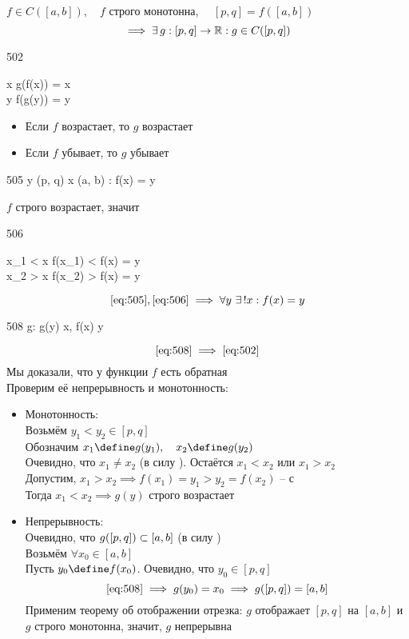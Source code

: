 \begin{theorem}
	$f \in C([a, b]), \quad f $ строго монотонна, $ \quad [p, q] = f([a, b]) $
	$$ \implies \exists\, g : [p, q] \to \mathbb{R} : g \in C([p, q]) $$
	\begin{equ}{502}
		\begin{cases}
			\forall x \in [a, b] \quad g(f(x)) = x \\
			\forall y \in [p, q] \quad f(g(y)) = y
		\end{cases}
	\end{equ}

	\begin{itemize}
		\item Если $f$ возрастает, то $g$ возрастает
		\item Если $f$ убывает, то $g$ убывает
	\end{itemize}
\end{theorem}

\begin{replacementproof}
	\begin{equ}{505}
		\forall y \in (p, q) \quad \exist x \in (a, b) : f(x) = y
	\end{equ}
	$f$ строго возрастает, значит
	\begin{equ}{506}
		\begin{rcases}
			x_1 < x \implies f(x_1) < f(x) = y \\
			x_2 > x \implies f(x_2) > f(x) = y
		\end{rcases}
	\end{equ}
	$$ \eref{505}, \eref{506} \implies \forall y ~ \exist! x : f(x) = y $$
	\begin{equ}{508}
		 g:  g(y)  x, \quad f(x)  y
	\end{equ}
	$$ \eref{508} \implies \eref{502} $$
	Мы доказали, что у функции $f$ есть обратная \\
	Проверим её непрерывность и монотонность:
	\begin{itemize}
		\ \item Монотонность: \\
		Возьмём $y_1 < y_2 \in [p, q]$ \\
		Обозначим $x_1 \define g(y_1), \quad x_2 \define g(y_2)$ \\
		Очевидно, что $x_1 \ne x_2$ (в силу ). Остаётся $x_1 < x_2$ или $x_1 > x_2$ \\
		Допустим, $x_1 > x_2 \implies f(x_1) = y_1 > y_2 = f(x_2) $ -- \contra с  \\
		Тогда $ x_1 < x_2 \implies g(y) $ строго возрастает
		\item Непрерывность: \\
		Очевидно, что $g([p, q]) \subset [a, b]$ (в силу ) \\
		Возьмём $\forall x_0 \in [a, b]$ \\
		Пусть $y_0 \define f(x_0)$. Очевидно, что $y_0 \in [p, q]$
		$$ \eref{508} \implies g(y_0) = x_0 \implies g([p, q]) = [a, b] $$
		Применим теорему об отображении отрезка: $g$ отображает $[p, q]$ на $[a, b]$ и $g$ строго монотонна, значит, $g$ непрерывна
	\end{itemize}
\end{replacementproof}

